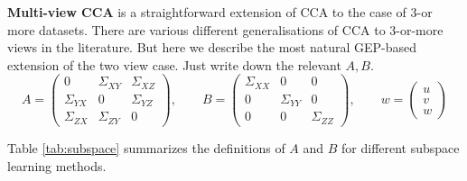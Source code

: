 \textbf{Multi-view CCA} is a straightforward extension of CCA to the case of 3-or more datasets.
There are various different generalisations of CCA to 3-or-more views in the literature.
But here we describe the most natural GEP-based extension of the two view case. Just write down the relevant $A,B$.
\begin{equation}\label{eq:multi-view-cca-GEV}
    A = \begin{pmatrix} 0 &\Sigma_{XY} & \Sigma_{XZ} \\ \Sigma_{YX} & 0 & \Sigma_{YZ} \\ \Sigma_{ZX} & \Sigma_{ZY} & 0 \end{pmatrix}, \qquad
    B = \begin{pmatrix}\Sigma_{XX} & 0 & 0 \\ 0 & \Sigma_{YY} & 0 \\ 0 & 0 & \Sigma_{ZZ} \end{pmatrix}, \qquad
    w =\begin{pmatrix}	u \\ v \\ w \end{pmatrix}
\end{equation}

Table \ref{tab:subspace} summarizes the definitions of $A$ and $B$ for different subspace learning methods.


